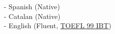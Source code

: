 \section*{\faCommenting} \label{sec:languages}
 {}

{
    \raggedright
    - Spanish (Native) \\
    - Catalan (Native) \\
    - English (Fluent,
    \href{https://upvedues-my.sharepoint.com/:b:/g/personal/angibo2_upv_edu_es/EfpKlOKvzn1GlsNVsejwsHMB-4n1z00U9Z1Rra9upJHNBg?e=f1LV5Z}{TOEFL
    99 IBT}) \\
}